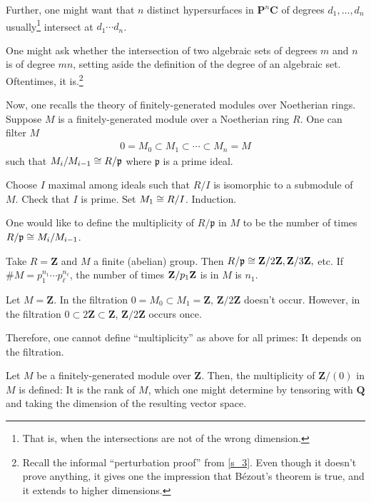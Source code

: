 \documentclass [11 pt, oneside] {article}
\begin{document}
Further, one might want that $n$ distinct hypersurfaces in $\mathbf{P}^n\mathbf{C}$ of degrees $d_1,\hdots, d_n$ usually\footnote{That is, when the intersections are not of the wrong dimension.} intersect at $d_1\cdots d_n$.

One might ask whether the intersection of two algebraic sets of degrees $m$ and $n$ is of degree $mn$, setting aside the definition of the degree of an algebraic set. Oftentimes, it is.\footnote{Recall the informal ``perturbation proof'' from \cref{s_3}. Even though it doesn't prove anything, it gives one the impression that B\'ezout's theorem is true, and it extends to higher dimensions.} 

Now, one recalls the theory of finitely-generated modules over Noetherian rings. Suppose $M$ is a finitely-generated module over a Noetherian ring $R$. One can filter $M$
\begin{align*}
	0=M_0 \subset M_1\subset \cdots\subset M_n=M
\end{align*}
such that $M_i/M_{i-1} \cong R/\mathfrak{p}$ where $\mathfrak{p}$ is a prime ideal.
\begin{esquisse}
	Choose $I$ maximal among ideals such that $R/I$ is isomorphic to a submodule of $M$. Check that $I$ is prime. Set $M_1\cong R/I$. Induction.
\end{esquisse}

One would like to define the multiplicity of $R/\mathfrak{p}$ in $M$ to be the number of times $R/\mathfrak{p}\cong M_i/M_{i-1}$.

\begin{example}[ ]\label{}\text{}
Take $R=\mathbf{Z}$ and $M$ a finite (abelian) group. Then $R/\mathfrak{p} \cong \mathbf Z/2\mathbf Z,\mathbf Z/3\mathbf Z,$ etc. If $\# M = p_1^{n_1}\cdots p_\ell^{n_\ell}$, the number of times $\mathbf Z/p_1\mathbf Z$ is in $M$ is $n_1$. 
\end{example}

\begin{example}[ ]\label{fail_1}\text{}
Let $M=\mathbf{Z}$. In the filtration $0=M_0\subset M_1=\mathbf{Z}$, $\mathbf{Z}/2\mathbf{Z}$ doesn't occur. However, in the filtration $0\subset 2\mathbf{Z}\subset \mathbf{Z}$, $\mathbf{Z}/2\mathbf{Z}$ occurs once.
\end{example}

\begin{remark}
	Therefore, one cannot define ``multiplicity'' as above for all primes: It depends on the filtration.
\end{remark}

\begin{example}[ ]\label{}\text{}
Let $M$ be a finitely-generated module over $\mathbf{Z}$. Then, the multiplicity of $\mathbf{Z}/(0)$ in $M$ is defined: It is the rank of $M$, which one might determine by tensoring with $\mathbf{Q}$ and taking the dimension of the resulting vector space.
\end{example}
\end{document}
